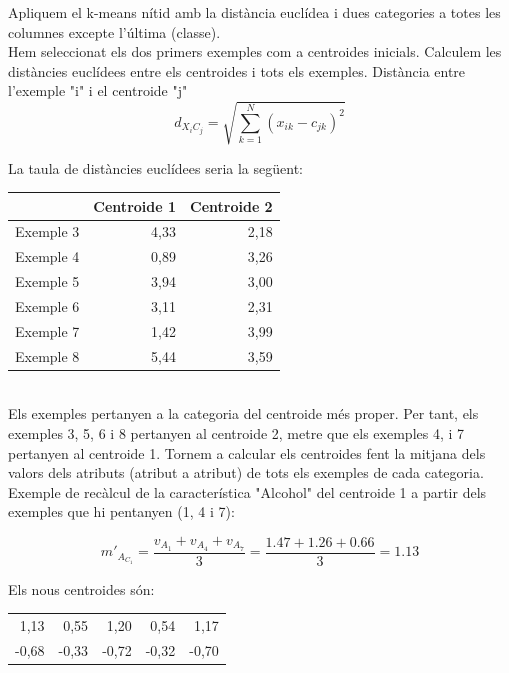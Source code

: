 \documentclass{article} %
\begin{document}
{\color{blue}
	Apliquem el k-means nítid amb la distància euclídea i dues categories a totes les columnes excepte l'última (classe). \\

	Hem seleccionat els dos primers exemples com a centroides inicials. Calculem les distàncies euclídees entre els centroides i tots els exemples. Distància entre l'exemple "i" i el centroide "j" \\

	\[d_{X_iC_j} = \sqrt{\sum\limits_{k=1}^N (x_{ik}-c_{jk})^2}\]

	La taula de distàncies euclídees seria la següent: \\

	{\selectfont\small
	\begin{tabular}{r r r}
	 	          & Centroide 1 & Centroide 2 \\ \hline
		Exemple 3 & 4,33        & 2,18 \\
		Exemple 4 & 0,89        & 3,26 \\
		Exemple 5 & 3,94        & 3,00 \\
		Exemple 6 & 3,11        & 2,31 \\
		Exemple 7 & 1,42        & 3,99 \\
		Exemple 8 & 5,44        & 3,59 \\
	\end{tabular}
	} \\

	Els exemples pertanyen a la categoria del centroide més proper. Per tant, els exemples 3, 5, 6 i 8 pertanyen al centroide 2, metre que els exemples 4, i 7 pertanyen al centroide 1. Tornem a calcular els centroides fent la mitjana dels valors dels atributs (atribut a atribut) de tots els exemples de cada categoria. \\

	Exemple de recàlcul de la característica "Alcohol" del centroide 1 a partir dels exemples que hi pentanyen (1, 4 i 7): 

	\[m'_{A_{C_1}} = \frac{v_{A_1} + v_{A_4} + v_{A_7}}{3}= \frac{1.47 + 1.26 + 0.66}{3}=1.13\]


	Els nous centroides són: \\

	{\selectfont\small
	\begin{tabular}{r r r r r}
		1,13  & 0,55  & 1,20  & 0,54  & 1,17 \\
		-0,68  & -0,33  & -0,72  & -0,32  & -0,70 \\
	\end{tabular}
	} \\
	

}
\end{document}

